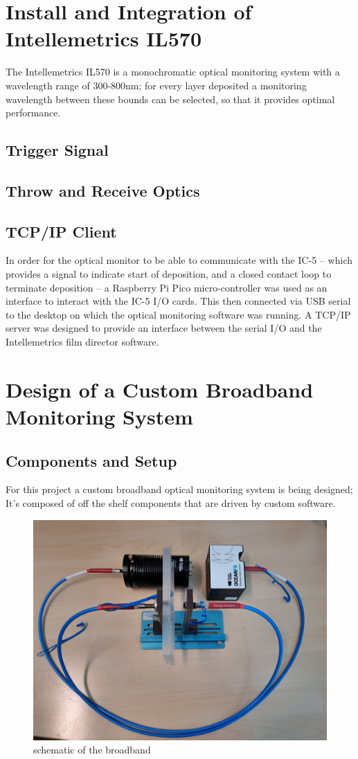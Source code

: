 \documentclass[10pt,a4paper,portrait]{report}
\begin{document}
\section{Install and Integration of Intellemetrics IL570}
The Intellemetrics IL570 is a monochromatic optical monitoring system with a wavelength range of 300-800nm; for every layer deposited a monitoring wavelength between these bounds can be selected, so that it provides optimal performance.

\subsection{Trigger Signal}
\subsection{Throw and Receive Optics}
\subsection{TCP/IP Client}
In order for the optical monitor to be able to communicate with the IC-5 -- which provides a signal to indicate start of deposition, and a closed contact loop to terminate deposition -- a Raspberry Pi Pico micro-controller was used as an interface to interact with the IC-5 I/O cards. This then connected via USB serial to the desktop on which the optical monitoring software was running. A TCP/IP server was designed to provide an interface between the serial I/O and the Intellemetrics film director software.


\section{Design of a Custom Broadband Monitoring System}
\subsection{Components and Setup}

For this project a custom broadband optical monitoring system is being designed; It's composed of off the shelf components that are driven by custom software.

\begin{figure}
\label{fig:broadband-test-bed}
\begin{center}
\includegraphics[width=0.6\linewidth]{broadband-test-bed.jpg}
\end{center}
\caption{schematic of the broadband}
\end{figure}
 
\end{document}
